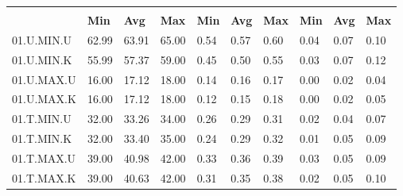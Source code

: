 \begin{tabular}{|>{\raggedright}p{}|>{\raggedright}p{}|>{\raggedright}p{}|>{\raggedright}p{}|>{\raggedright}p{}|>{\raggedright}p{}|>{\raggedright}p{}|>{\raggedright}p{}|>{\raggedright}p{}|>{\raggedright}p{}|}
\hline 
\multirow{2}{0.12\columnwidth}{\textbf{\footnotesize{}Bezeichnung}} & \multicolumn{3}{l|}{\textbf{\footnotesize{}CPU-Last {[}\%{]}}} & \multicolumn{3}{l|}{\textbf{\footnotesize{}Systemtime {[}s{]}}} & \multicolumn{3}{l|}{\textbf{\footnotesize{}Usertime {[}s{]}}}\tabularnewline
\cline{2-10} 
& \textbf{\footnotesize{}Min} & \textbf{\footnotesize{}Avg} & \textbf{\footnotesize{}Max} & \textbf{\footnotesize{}Min} & \textbf{\footnotesize{}Avg} & \textbf{\footnotesize{}Max} & \textbf{\footnotesize{}Min} & \textbf{\footnotesize{}Avg} & \textbf{\footnotesize{}Max}\tabularnewline
\hline 
\hline 
{\footnotesize{}01.U.MIN.U} & {\footnotesize{}62.99} & {\footnotesize{}63.91} & {\footnotesize{}65.00} & {\footnotesize{}0.54} & {\footnotesize{}0.57} & {\footnotesize{}0.60} & {\footnotesize{}0.04} & {\footnotesize{}0.07} & {\footnotesize{}0.10}\tabularnewline
\hline 
\hline 
{\footnotesize{}01.U.MIN.K} & {\footnotesize{}55.99} & {\footnotesize{}57.37} & {\footnotesize{}59.00} & {\footnotesize{}0.45} & {\footnotesize{}0.50} & {\footnotesize{}0.55} & {\footnotesize{}0.03} & {\footnotesize{}0.07} & {\footnotesize{}0.12}\tabularnewline
\hline 
\hline 
{\footnotesize{}01.U.MAX.U} & {\footnotesize{}16.00} & {\footnotesize{}17.12} & {\footnotesize{}18.00} & {\footnotesize{}0.14} & {\footnotesize{}0.16} & {\footnotesize{}0.17} & {\footnotesize{}0.00} & {\footnotesize{}0.02} & {\footnotesize{}0.04}\tabularnewline
\hline 
\hline 
{\footnotesize{}01.U.MAX.K} & {\footnotesize{}16.00} & {\footnotesize{}17.12} & {\footnotesize{}18.00} & {\footnotesize{}0.12} & {\footnotesize{}0.15} & {\footnotesize{}0.18} & {\footnotesize{}0.00} & {\footnotesize{}0.02} & {\footnotesize{}0.05}\tabularnewline
\hline 
\hline 
{\footnotesize{}01.T.MIN.U} & {\footnotesize{}32.00} & {\footnotesize{}33.26} & {\footnotesize{}34.00} & {\footnotesize{}0.26} & {\footnotesize{}0.29} & {\footnotesize{}0.31} & {\footnotesize{}0.02} & {\footnotesize{}0.04} & {\footnotesize{}0.07}\tabularnewline
\hline 
\hline 
{\footnotesize{}01.T.MIN.K} & {\footnotesize{}32.00} & {\footnotesize{}33.40} & {\footnotesize{}35.00} & {\footnotesize{}0.24} & {\footnotesize{}0.29} & {\footnotesize{}0.32} & {\footnotesize{}0.01} & {\footnotesize{}0.05} & {\footnotesize{}0.09}\tabularnewline
\hline 
\hline 
{\footnotesize{}01.T.MAX.U} & {\footnotesize{}39.00} & {\footnotesize{}40.98} & {\footnotesize{}42.00} & {\footnotesize{}0.33} & {\footnotesize{}0.36} & {\footnotesize{}0.39} & {\footnotesize{}0.03} & {\footnotesize{}0.05} & {\footnotesize{}0.09}\tabularnewline
\hline 
\hline 
{\footnotesize{}01.T.MAX.K} & {\footnotesize{}39.00} & {\footnotesize{}40.63} & {\footnotesize{}42.00} & {\footnotesize{}0.31} & {\footnotesize{}0.35} & {\footnotesize{}0.38} & {\footnotesize{}0.02} & {\footnotesize{}0.05} & {\footnotesize{}0.10}\tabularnewline
\hline 
\end{tabular}
\par
